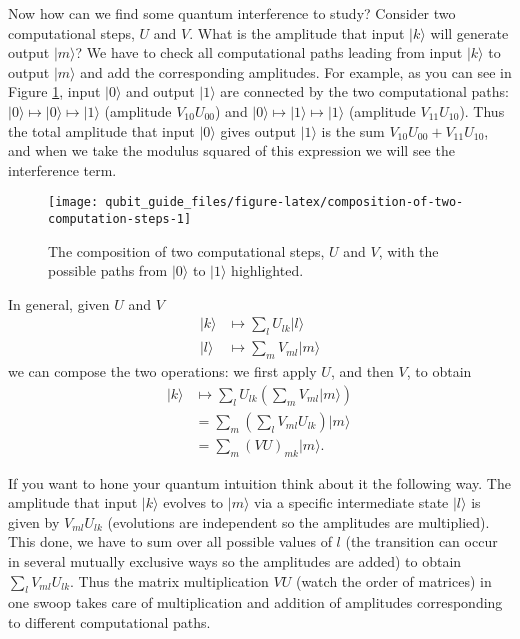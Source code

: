 \documentclass[fleqn]{article}
\begin{document}
Now how can we find some quantum interference to study?
Consider two computational steps, \(U\) and \(V\).
What is the amplitude that input \(|k\rangle\) will generate output \(|m\rangle\)?
We have to check all computational paths leading from input \(|k\rangle\) to output \(|m\rangle\) and add the corresponding amplitudes.
For example, as you can see in Figure \ref{fig:composition-of-two-computation-steps}, input \(|0\rangle\) and output \(|1\rangle\) are connected by the two computational paths: \(|0\rangle\mapsto|0\rangle\mapsto|1\rangle\) (amplitude \(V_{10}U_{00}\)) and \(|0\rangle\mapsto|1\rangle\mapsto|1\rangle\) (amplitude \(V_{11}U_{10}\)).
Thus the total amplitude that input \(|0\rangle\) gives output \(|1\rangle\) is the sum \(V_{10}U_{00}+V_{11}U_{10}\), and when we take the modulus squared of this expression we will see the interference term.



\begin{figure}[H]

{\centering \texttt{[image: qubit\_guide\_files/figure-latex/composition-of-two-computation-steps-1]} 

}

\caption{The composition of two computational steps, \(U\) and \(V\), with the possible paths from \(|0\rangle\) to \(|1\rangle\) highlighted.}\label{fig:composition-of-two-computation-steps}
\end{figure}

In general, given \(U\) and \(V\)
\[
  \begin{aligned}
    |k\rangle
    &\longmapsto
    \sum_l U_{lk}|l\rangle
  \\|l\rangle
    &\longmapsto
    \sum_m V_{ml}|m\rangle
  \end{aligned}
\]
we can compose the two operations: we first apply \(U\), and then \(V\), to obtain
\[
  \begin{aligned}
    |k\rangle
    &\longmapsto
    \sum_l U_{lk} \left(
      \sum_m V_{ml}|m\rangle
    \right)
  \\&=
    \sum_m \left(
      \sum_l V_{ml}U_{lk}
    \right) |m\rangle
  \\&=
    \sum_m (VU)_{mk} |m\rangle.
  \end{aligned}
\]

If you want to hone your quantum intuition think about it the following way.
The amplitude that input \(|k\rangle\) evolves to \(|m\rangle\) via a specific intermediate state \(|l\rangle\) is given by \(V_{ml}U_{lk}\) (evolutions are independent so the amplitudes are multiplied).
This done, we have to sum over all possible values of \(l\) (the transition can occur in several mutually exclusive ways so the amplitudes are added) to obtain \(\sum_l V_{ml}U_{lk}\).
Thus the matrix multiplication \(VU\) (watch the order of matrices) in one swoop takes care of multiplication and addition of amplitudes corresponding to different computational paths.
\end{document}
